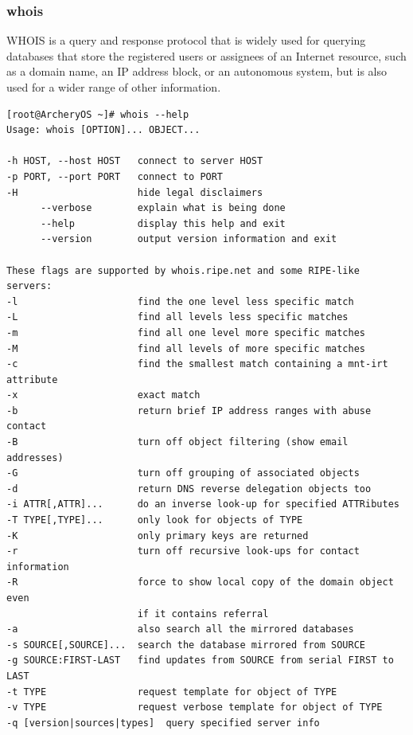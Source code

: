 \documentclass{article}
\begin{document}
\subsubsection{whois}
WHOIS is a query and response protocol that is widely used for querying databases that store the registered users or assignees of an Internet resource, such as a domain name, an IP address block, or an autonomous system, but is also used for a wider range of other information.
\begin{lstlisting}
[root@ArcheryOS ~]# whois --help
Usage: whois [OPTION]... OBJECT...

-h HOST, --host HOST   connect to server HOST
-p PORT, --port PORT   connect to PORT
-H                     hide legal disclaimers
      --verbose        explain what is being done
      --help           display this help and exit
      --version        output version information and exit

These flags are supported by whois.ripe.net and some RIPE-like servers:
-l                     find the one level less specific match
-L                     find all levels less specific matches
-m                     find all one level more specific matches
-M                     find all levels of more specific matches
-c                     find the smallest match containing a mnt-irt attribute
-x                     exact match
-b                     return brief IP address ranges with abuse contact
-B                     turn off object filtering (show email addresses)
-G                     turn off grouping of associated objects
-d                     return DNS reverse delegation objects too
-i ATTR[,ATTR]...      do an inverse look-up for specified ATTRibutes
-T TYPE[,TYPE]...      only look for objects of TYPE
-K                     only primary keys are returned
-r                     turn off recursive look-ups for contact information
-R                     force to show local copy of the domain object even
                       if it contains referral
-a                     also search all the mirrored databases
-s SOURCE[,SOURCE]...  search the database mirrored from SOURCE
-g SOURCE:FIRST-LAST   find updates from SOURCE from serial FIRST to LAST
-t TYPE                request template for object of TYPE
-v TYPE                request verbose template for object of TYPE
-q [version|sources|types]  query specified server info
\end{lstlisting}
\end{document}
